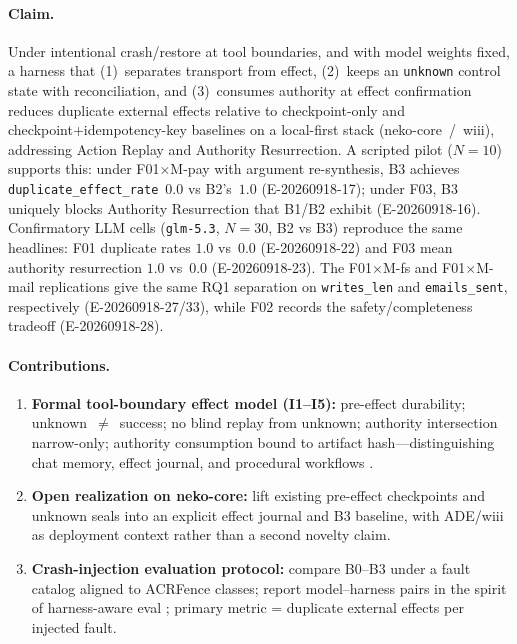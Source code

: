 \documentclass[11pt,a4paper]{article}
\begin{document}
\paragraph{Claim.}
Under intentional crash/restore at tool boundaries, and with model weights
fixed, a harness that (1)~separates transport from effect, (2)~keeps an
\texttt{unknown} control state with reconciliation, and (3)~consumes
authority at effect confirmation reduces duplicate external effects
relative to checkpoint-only and checkpoint+idempotency-key baselines on a
local-first stack (neko-core~/~wiii), addressing Action Replay and
Authority Resurrection. A scripted pilot ($N{=}10$) supports this: under
F01$\times$M-pay with argument re-synthesis, B3 achieves
\texttt{duplicate\_effect\_rate}~$0.0$ vs B2's~$1.0$
(E-20260918-17); under F03, B3 uniquely blocks Authority Resurrection
that B1/B2 exhibit (E-20260918-16). Confirmatory LLM cells
(\texttt{glm-5.3}, $N{=}30$, B2 vs B3) reproduce the same headlines:
F01 duplicate rates $1.0$ vs~$0.0$ (E-20260918-22) and F03 mean
authority resurrection $1.0$ vs~$0.0$ (E-20260918-23). The F01$\times$M-fs and F01$\times$M-mail replications give the same RQ1
separation on \texttt{writes\_len} and \texttt{emails\_sent}, respectively
(E-20260918-27/33), while F02 records the safety/completeness tradeoff
(E-20260918-28).

\paragraph{Contributions.}
\begin{enumerate}
\item \textbf{Formal tool-boundary effect model (I1--I5):}
pre-effect durability; unknown~$\neq$~success; no blind replay from
unknown; authority intersection narrow-only; authority consumption bound
to artifact hash---distinguishing chat memory, effect journal, and
procedural workflows \cite{awm2025}.
\item \textbf{Open realization on neko-core:}
lift existing pre-effect checkpoints and unknown seals into an explicit
effect journal and B3 baseline, with ADE/wiii as deployment context rather
than a second novelty claim.
\item \textbf{Crash-injection evaluation protocol:}
compare B0--B3 under a fault catalog aligned to ACRFence classes; report
model--harness pairs in the spirit of harness-aware eval
\cite{harnessbench2026,agencybench2026,hal2025}; primary metric =
duplicate external effects per injected fault.
\end{enumerate}
\end{document}
